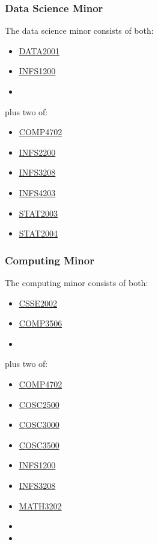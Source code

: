 \documentclass[a4paper,12pt]{report}
\begin{document}
\subsubsection{Data Science Minor}
The data science minor consists of both:
\begin{multicols}{3}
    \begin{itemize}
        \item \hyperlink{DATA2001}{DATA2001}
        \item \hyperlink{INFS1200}{INFS1200}
        \item[]
    \end{itemize}
\end{multicols}
plus two of:
\begin{multicols}{3}
    \begin{itemize}
        \item \hyperlink{COMP4702}{COMP4702}
        \item \hyperlink{INFS2200}{INFS2200}
        \item \hyperlink{INFS3208}{INFS3208}
        \item \hyperlink{INFS4203}{INFS4203}
        \item \hyperlink{STAT2003}{STAT2003}
        \item \hyperlink{STAT2004}{STAT2004}
    \end{itemize}
\end{multicols}
\newpage

\subsubsection{Computing Minor}
The computing minor consists of both:
\begin{multicols}{3}
    \begin{itemize}
        \item \hyperlink{CSSE2002}{CSSE2002}
        \item \hyperlink{COMP3506}{COMP3506}
        \item[]
    \end{itemize}
\end{multicols}
plus two of:
\begin{multicols}{3}
    \begin{itemize}
        \item \hyperlink{COMP4702}{COMP4702}
        \item \hyperlink{COSC2500}{COSC2500}
        \item \hyperlink{COSC3000}{COSC3000}
        \item \hyperlink{COSC3500}{COSC3500}
        \item \hyperlink{INFS1200}{INFS1200}
        \item \hyperlink{INFS3208}{INFS3208}
        \item \hyperlink{MATH3202}{MATH3202}
        \item[]
        \item[]
    \end{itemize}
\end{multicols}
\end{document}
